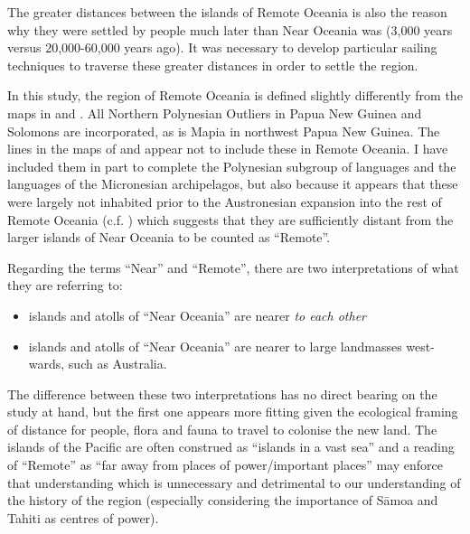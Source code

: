 \documentclass[unnumsec,webpdf,modern,medium]{oup-authoring-template}
\begin{document}
The greater distances between the islands of Remote Oceania is also the reason why they were settled by people much later than Near Oceania was (3,000 years versus 20,000-60,000 years ago). It was necessary to develop particular sailing techniques to traverse these greater distances in order to settle the region.

In this study, the region of Remote Oceania is defined slightly differently from the maps in \citet{green1991near} and \citet{pawley2007locatingoceanic}. All Northern Polynesian Outliers in Papua New Guinea and Solomons are incorporated, as is Mapia in northwest Papua New Guinea. The lines in the maps of \citet{green1991near} and \citet{pawley2007locatingoceanic} appear not to include these in Remote Oceania. I have included them in part to complete the Polynesian subgroup of languages and the languages of the Micronesian archipelagos, but also because it appears that these were largely not inhabited prior to the Austronesian expansion into the rest of Remote Oceania (c.f. \citet[23]{kirch2012basline}) which suggests that they are sufficiently distant from the larger islands of Near Oceania to be counted as ``Remote''.

Regarding the terms ``Near'' and ``Remote'', there are two interpretations of what they are referring to:

\begin{itemize}
    \item islands and atolls of ``Near Oceania'' are nearer \emph{to each other} 
    \item islands and atolls of ``Near Oceania'' are nearer to large landmasses west-wards, such as Australia.
\end{itemize}

The difference between these two interpretations has no direct bearing on the study at hand, but the first one appears more fitting given the ecological framing of distance for people, flora and fauna to travel to colonise the new land. The islands of the Pacific are often construed as ``islands in a vast sea'' \citep{hauofa_1993} and a reading of ``Remote'' as ``far away from places of power/important places'' may enforce that understanding which is unnecessary and detrimental to our understanding of the history of the region (especially considering the importance of S\={a}moa and Tahiti as centres of power). 

\FloatBarrier
\end{document}
